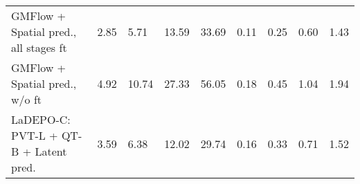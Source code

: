 \begin{table}[h!]
\begin{tabular}{lllllllll}
GMFlow + Spatial pred., all stages ft & {\cellcolor[HTML]{006837}} \color[HTML]{F1F1F1} 2.85 & {\cellcolor[HTML]{006837}} \color[HTML]{F1F1F1} 5.71 & {\cellcolor[HTML]{30A356}} \color[HTML]{F1F1F1} 13.59 & {\cellcolor[HTML]{78C565}} \color[HTML]{000000} 33.69 & {\cellcolor[HTML]{006837}} \color[HTML]{F1F1F1} 0.11 & {\cellcolor[HTML]{006837}} \color[HTML]{F1F1F1} 0.25 & {\cellcolor[HTML]{006837}} \color[HTML]{F1F1F1} 0.60 & {\cellcolor[HTML]{91D068}} \color[HTML]{000000} 1.43 \\
GMFlow + Spatial pred., w/o ft & {\cellcolor[HTML]{F7FCB4}} \color[HTML]{000000} 4.92 & {\cellcolor[HTML]{FED07E}} \color[HTML]{000000} 10.74 & {\cellcolor[HTML]{B10B26}} \color[HTML]{F1F1F1} 27.33 & {\cellcolor[HTML]{BE1827}} \color[HTML]{F1F1F1} 56.05 & {\cellcolor[HTML]{EBF7A3}} \color[HTML]{000000} 0.18 & {\cellcolor[HTML]{FED683}} \color[HTML]{000000} 0.45 & {\cellcolor[HTML]{DE402E}} \color[HTML]{F1F1F1} 1.04 & {\cellcolor[HTML]{B10B26}} \color[HTML]{F1F1F1} 1.94 \\
LaDEPO-C: PVT-L + QT-B + Latent pred. & {\cellcolor[HTML]{4EB15D}} \color[HTML]{F1F1F1} 3.59 & {\cellcolor[HTML]{15904C}} \color[HTML]{F1F1F1} 6.38 & {\cellcolor[HTML]{08773F}} \color[HTML]{F1F1F1} 12.02 & {\cellcolor[HTML]{1B9950}} \color[HTML]{F1F1F1} 29.74 & {\cellcolor[HTML]{BFE47A}} \color[HTML]{000000} 0.16 & {\cellcolor[HTML]{82C966}} \color[HTML]{000000} 0.33 & {\cellcolor[HTML]{6BBF64}} \color[HTML]{000000} 0.71 & {\cellcolor[HTML]{D5ED88}} \color[HTML]{000000} 1.52 \\
\bottomrule
\end{tabular}
\end{table}
